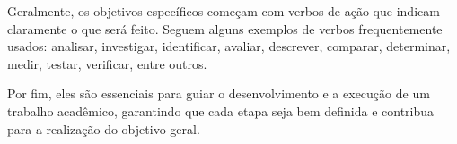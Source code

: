 Geralmente, os objetivos específicos começam com verbos de ação que indicam claramente o que será feito. Seguem alguns exemplos de verbos frequentemente usados: analisar, investigar, identificar, avaliar, descrever, comparar, determinar, medir, testar, verificar, entre outros.

Por fim, eles são essenciais para guiar o desenvolvimento e a execução de um trabalho acadêmico, garantindo que cada etapa seja bem definida e contribua para a realização do objetivo geral.